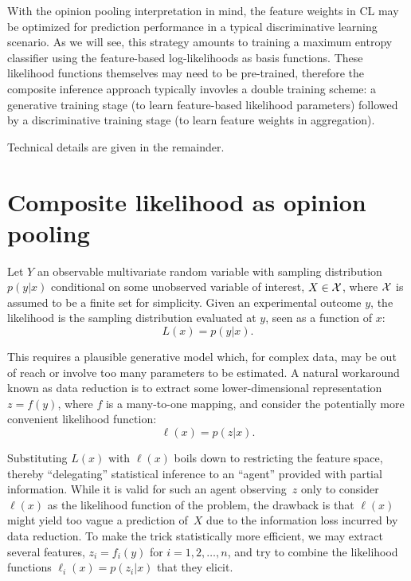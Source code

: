 \documentclass[english]{scrartcl}
\begin{document}
With the opinion pooling interpretation in mind, the feature weights in CL may be optimized for prediction performance in a typical discriminative learning scenario. As we will see, this strategy amounts to training a maximum entropy classifier using the feature-based log-likelihoods as basis functions. These likelihood functions themselves may need to be pre-trained, therefore the composite inference approach typically invovles a double training scheme: a generative training stage (to learn feature-based likelihood parameters) followed by a discriminative training stage (to learn feature weights in aggregation).

Technical details are given in the remainder.



\section{Composite likelihood as opinion pooling}
\label{sec:log_pool}

Let $Y$ an observable multivariate random variable with sampling distribution $p(y|x)$ conditional on some unobserved variable of interest, $X\in{\cal X}$, where ${\cal X}$ is assumed to be a finite set for simplicity. Given an experimental outcome $y$, the likelihood is the sampling distribution evaluated at $y$, seen as a function of $x$:
$$
L(x) = p(y|x)
.
$$

This requires a plausible generative model which, for complex data, may be out of reach or involve too many parameters to be estimated. A natural workaround known as data reduction is to extract some lower-dimensional representation $z=f(y)$, where $f$ is a many-to-one mapping, and consider the potentially more convenient likelihood function:
$$
\ell(x) = p(z|x)
.
$$

Substituting $L(x)$ with $\ell(x)$ boils down to restricting the feature space, thereby  ``delegating'' statistical inference to an ``agent'' provided with partial information. While it is valid for such an agent observing~$z$ only to consider $\ell(x)$ as the likelihood function of the problem, the drawback is that $\ell(x)$ might yield too vague a prediction of~$X$ due to the information loss incurred by data reduction. To make the trick statistically more efficient, we may extract several features, $z_i=f_i(y)$ for $i=1,2,\ldots,n$, and try to combine the likelihood functions $\ell_i(x) = p(z_i|x)$ that they elicit.
\end{document}
